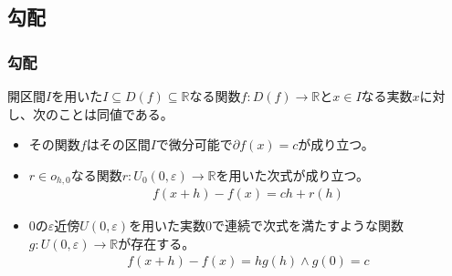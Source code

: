 \documentclass[dvipdfmx]{jsarticle}
\begin{document}
\subsection{勾配}%
\subsubsection{勾配}%
\begin{thm}\label{4.2.5.1}
開区間$I$を用いた$I \subseteq D(f) \subseteq \mathbb{R}$なる関数$f:D(f) \rightarrow \mathbb{R}$と$x \in I$なる実数$x$に対し、次のことは同値である。
\begin{itemize}
\item
  その関数$f$はその区間$I$で微分可能で$\partial f(x) = c$が成り立つ。
\item
  $r \in o_{h,0}$なる関数$r:U_{0}(0,\varepsilon) \rightarrow \mathbb{R}$を用いた次式が成り立つ。
\begin{align*}
f(x + h) - f(x) = ch + r(h)
\end{align*}
\item
  $0$の$\varepsilon$近傍$U(0,\varepsilon)$を用いた実数0で連続で次式を満たすような関数$g:U(0,\varepsilon) \rightarrow \mathbb{R}$が存在する。
\begin{align*}
f(x + h) - f(x) = hg(h) \land g(0) = c
\end{align*}
\end{itemize}
\end{thm}
\end{document}
